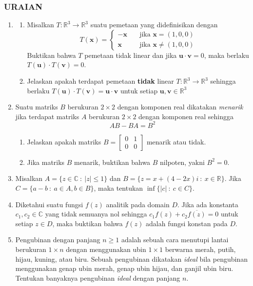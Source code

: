 \documentclass[12pt,twoside]{article}
\begin{document}
\subsubsection*{URAIAN}
\begin{enumerate}
	\item \begin{enumerate}
		      \item Misalkan $T:\mathbb{R}^3\to\mathbb{R}^3$ suatu pemetaan yang didefinisikan dengan
		            \[T(\mathbf{x})=\begin{cases}
				            -\mathbf{x}\quad & \text{jika } \mathbf{x}=(1,0,0)     \\
				            \mathbf{x}\quad  & \text{jika } \mathbf{x}\neq (1,0,0)
			            \end{cases}\]
		            Buktikan bahwa $T$ pemetaan tidak linear dan jika $\mathbf{u}\cdot\mathbf{v}=0$, maka berlaku $T(\mathbf{u})\cdot T(\mathbf{v})=0$.
		      \item Jelaskan apakah terdapat pemetaan \textbf{tidak} linear $T:\mathbb{R}^3\to\mathbb{R}^3$ sehingga berlaku $T(\mathbf{u})\cdot T(\mathbf{v})=\mathbf{u}\cdot\mathbf{v}$ untuk setiap $\mathbf{u},\mathbf{v}\in\mathbb{R}^3$
	      \end{enumerate}
	\item Suatu matriks $B$ berukuran $2\times 2$ dengan komponen real dikatakan \textit{menarik} jika terdapat matriks $A$ berukuran $2\times 2$ dengan komponen real sehingga
	      \[AB-BA=B^2\]
	      \begin{enumerate}
		      \item Jelaskan apakah matriks $B=\begin{bmatrix}
				            0 & 1 \\ 0 & 0
			            \end{bmatrix}$ menarik atau tidak.
		      \item Jika matriks $B$ menarik, buktikan bahwa $B$ nilpoten, yakni $B^2=0$.
	      \end{enumerate}
	\item Misalkan $A=\{z\in \mathbb{C}~:~ |z|\leq 1\}$ dan $B=\{z=x+(4-2x)i~:~x\in\mathbb{R}\}$. Jika $C=\{a-b~:~a\in A, b\in B\}$, maka tentukan $\inf\{|c|~:~c\in C\}$.
	\item Diketahui suatu fungsi $f(z)$ analitik pada domain $D$. Jika ada konstanta $c_1,c_2\in\mathbb{C}$ yang tidak semuanya nol sehingga $c_1f(z)+c_2\overline{f(z)}=0$ untuk setiap $z\in D$, maka buktikan bahwa $f(z)$ adalah fungsi konstan pada $D$.
	\item Pengubinan dengan panjang $n\geq 1$ adalah sebuah cara menutupi lantai berukuran $1\times n$ dengan menggunakan ubin $1\times 1$ berwarna merah, putih, hijau, kuning, atau biru. Sebuah pengubinan dikatakan \textit{ideal} bila pengubinan menggunakan genap ubin merah, genap ubin hijau, dan ganjil ubin biru. Tentukan banyaknya pengubinan \textit{ideal} dengan panjang $n$.
\end{enumerate}
\newpage
{}
\end{document}
